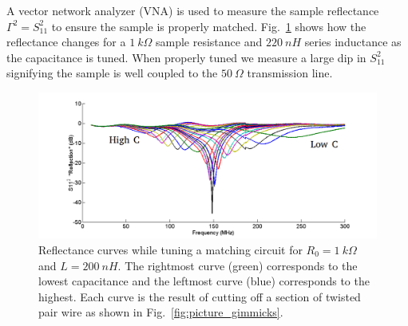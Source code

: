 A vector network analyzer (VNA) is used to measure the sample reflectance $\Gamma^2 = S_{11}^2$ to ensure the sample is properly matched. Fig.~\ref{fig:gimmick_tuning} shows how the reflectance changes for a $1~k\Omega$ sample resistance and $220~nH$ series inductance as the capacitance is tuned. When properly tuned we measure a large dip in $S_{11}^2$ signifying the sample is well coupled to the $50~\Omega$ transmission line.
\begin{figure}
\centering
\includegraphics[width=\textwidth]{figures/Johnson_noise_thermometry/gimmick_tuning.png}
\caption{Reflectance curves while tuning a matching circuit for $R_0 = 1~k\Omega$ and $L = 200~nH$. The rightmost curve (green) corresponds to the lowest capacitance and the leftmost curve (blue) corresponds to the highest. Each curve is the result of cutting off a section of twisted pair wire as shown in Fig.~\ref{fig:picture_gimmicks}.}
\label{fig:gimmick_tuning}
\end{figure} 

